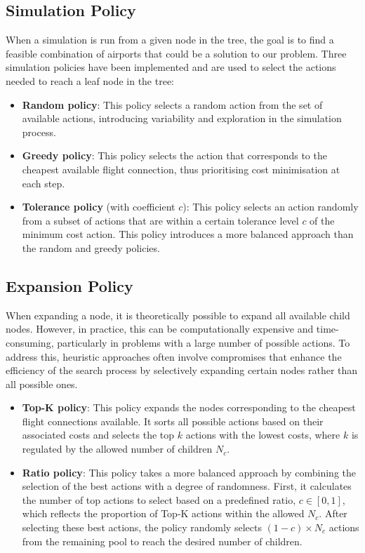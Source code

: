 \subsection{Simulation Policy}

When a simulation is run from a given node in the tree, the goal is to find a feasible combination of airports that could be a solution to our problem. Three simulation policies have been implemented and are used to select the actions needed to reach a leaf node in the tree:

\begin{itemize}
    \item \textbf{Random policy}: This policy selects a random action from the set of available actions, introducing variability and exploration in the simulation process.
    \item \textbf{Greedy policy}: This policy selects the action that corresponds to the cheapest available flight connection, thus prioritising cost minimisation at each step.
    \item \textbf{Tolerance policy} (with coefficient $c$): This policy selects an action randomly from a subset of actions that are within a certain tolerance level $c$ of the minimum cost action. This policy introduces a more balanced approach than the random and greedy policies.
\end{itemize}

\subsection{Expansion Policy}

When expanding a node, it is theoretically possible to expand all available child nodes. However, in practice, this can be computationally expensive and time-consuming, particularly in problems with a large number of possible actions. To address this, heuristic approaches often involve compromises that enhance the efficiency of the search process by selectively expanding certain nodes rather than all possible ones.

\begin{itemize}
    \item \textbf{Top-K policy}: This policy expands the nodes corresponding to the cheapest flight connections available. It sorts all possible actions based on their associated costs and selects the top \(k\) actions with the lowest costs, where \(k\) is regulated by the allowed number of children \(N_c\).
    \item \textbf{Ratio policy}: This policy takes a more balanced approach by combining the selection of the best actions with a degree of randomness. First, it calculates the number of top actions to select based on a predefined ratio, \(c \in [0,1]\), which reflects the proportion of Top-K actions within the allowed \(N_c\). After selecting these best actions, the policy randomly selects \((1-c) \times N_c\) actions from the remaining pool to reach the desired number of children.
\end{itemize}

